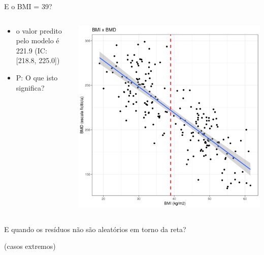 \documentclass{beamer}
\begin{document}
\begin{frame}{E o BMI = 39?}
  \begin{columns}
    \begin{column}{5cm}
      \begin{itemize}
        \small
      \item o valor predito pelo modelo é 221.9 (IC: [218.8, 225.0])
      \item P: O que isto significa?
      \end{itemize}
    \end{column}
    \begin{column}{5cm}
      \begin{center}
        \includegraphics[width=1.1\textwidth]{Cap18-19/pratica-rls4}
      \end{center}
    \end{column}
  \end{columns}
\end{frame}

\begin{frame}
  \begin{center}
    \Large
    E quando os resíduos não são aleatórios em torno da reta?
  \end{center}
  \vfill
  \hfill \footnotesize (casos extremos)
\end{frame}
\end{document}
